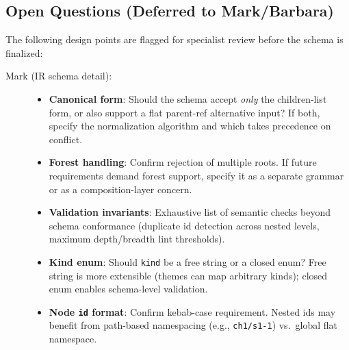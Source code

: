 \subsection{Open Questions (Deferred to Mark/Barbara)}
\label{sec:tree-open-questions}

The following design points are flagged for specialist review before the schema is finalized:

\begin{description}
  \item[Mark (IR schema detail):]
  \begin{itemize}
    \item \textbf{Canonical form}: Should the schema accept \emph{only} the children-list form, or also support a flat parent-ref alternative input? If both, specify the normalization algorithm and which takes precedence on conflict.
    \item \textbf{Forest handling}: Confirm rejection of multiple roots. If future requirements demand forest support, specify it as a separate grammar or as a composition-layer concern.
    \item \textbf{Validation invariants}: Exhaustive list of semantic checks beyond schema conformance (duplicate id detection across nested levels, maximum depth/breadth lint thresholds).
    \item \textbf{Kind enum}: Should \texttt{kind} be a free string or a closed enum? Free string is more extensible (themes can map arbitrary kinds); closed enum enables schema-level validation.
    \item \textbf{Node \texttt{id} format}: Confirm kebab-case requirement. Nested ids may benefit from path-based namespacing (e.g., \texttt{ch1/s1-1}) vs.\ global flat namespace.
  \end{itemize}
  

\end{description}

